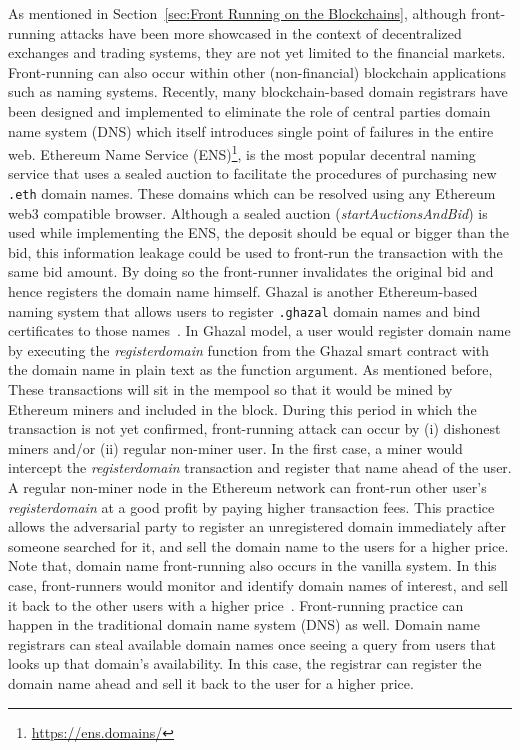 \noindent As mentioned in Section~\ref{sec:Front Running on the Blockchains}, although front-running attacks have been more showcased in the context of decentralized exchanges and trading systems, they are not yet limited to the financial markets. Front-running can also occur within other (non-financial) blockchain applications such as naming systems. Recently, many blockchain-based domain registrars have been designed and implemented to eliminate the role of central parties \ie domain name system (DNS) which itself introduces single point of failures in the entire web. Ethereum Name Service (ENS)\footnote{\url{https://ens.domains/}}, is the most popular decentral naming service that uses a sealed auction to facilitate the procedures of purchasing new \texttt{.eth} domain names. These domains which can be resolved using any Ethereum web3 compatible browser. Although a sealed auction (\textit{startAuctionsAndBid}) is used while implementing the ENS, the deposit should be equal or bigger than the bid, this information leakage could be used to front-run the transaction with the same bid amount. By doing so the front-runner invalidates the original bid and hence registers the domain name himself. Ghazal is another Ethereum-based naming system that allows users to register \texttt{.ghazal} domain names and bind certificates to those names~\cite{moosavighazal}.  In Ghazal model, a user would register domain name by executing the \textit{registerdomain} function from the Ghazal smart contract with the domain name in plain text as the function argument. As mentioned before, These transactions will sit in the mempool so that it would be mined by Ethereum miners and included in the block. During this period in which the transaction is not yet confirmed, front-running attack can occur by (i) dishonest miners and/or (ii) regular non-miner user. In the first case, a miner would intercept the \textit{registerdomain} transaction and register that name ahead of the user. A regular non-miner node in the Ethereum network can front-run other user's \textit{registerdomain} at a good profit by paying higher transaction fees. This practice allows the adversarial party  to register an unregistered domain immediately after someone searched for it, and sell the domain name to the users for a higher price. Note that, domain name front-running also occurs in the vanilla system. In this case, front-runners would monitor and identify domain names of interest, and sell it back to the other users with a higher price~\cite{sac022en33:online}. Front-running practice can happen in the traditional domain name system (DNS) as well. Domain name registrars can steal available domain names once seeing a query from users that looks up that domain's availability. In this case, the registrar can register the domain name ahead and sell it back to the user for a higher price.

